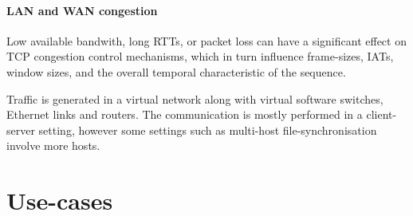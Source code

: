 \documentclass[conference]{IEEEtran}
\begin{document}
\paragraph{LAN and WAN congestion}
Low available bandwith, long RTTs, or packet loss can have a significant effect on TCP congestion control mechanisms, which in turn influence frame-sizes, IATs, window sizes, and the overall temporal characteristic of the sequence.

\vspace{0.2cm}

Traffic is generated in a virtual network along with virtual software switches, Ethernet links and routers. The communication is mostly performed in a client-server setting, however some settings such as multi-host file-synchronisation involve more hosts.






\section{Use-cases}
\end{document}
